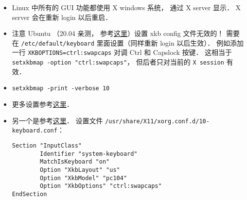 
\begin{itemize}
\item Linux 中所有的 GUI 功能都使用 X windows 系统， 通过 X server 显示． X server 会在重新 login 以后重启．
\item 注意 Ubuntu （20.04 亲测， 参考\href{https://manpages.ubuntu.com/manpages/focal/en/man5/keyboard.5.html}{这里}）设置 xkb config 文件无效的！ 需要在 \verb|/etc/default/keyboard| 里面设置（同样重新 login 以后生效）． 例如添加一行 \verb|XKBOPTIONS=ctrl:swapcaps| 对调 Ctrl 和 Capslock 按键． 这相当于 \verb|setxkbmap -option "ctrl:swapcaps"|， 但后者只对当前的 \verb|X session| 有效．
\item \verb|setxkbmap -print -verbose 10|
\item 更多设置参考\href{https://gist.github.com/jatcwang/ae3b7019f219b8cdc6798329108c9aee}{这里}．
\end{itemize}

\begin{itemize}
\item 另一个是参考\href{https://www.linux.com/training-tutorials/hacking-your-linux-keyboard-xkb/}{这里}． 设置文件 \verb`/usr/share/X11/xorg.conf.d/10-keyboard.conf`：
\begin{lstlisting}
Section "InputClass"
        Identifier "system-keyboard"
        MatchIsKeyboard "on"
        Option "XkbLayout" "us"
        Option "XkbModel" "pc104"
        Option "XkbOptions" "ctrl:swapcaps"
EndSection
\end{lstlisting}
\end{itemize}

